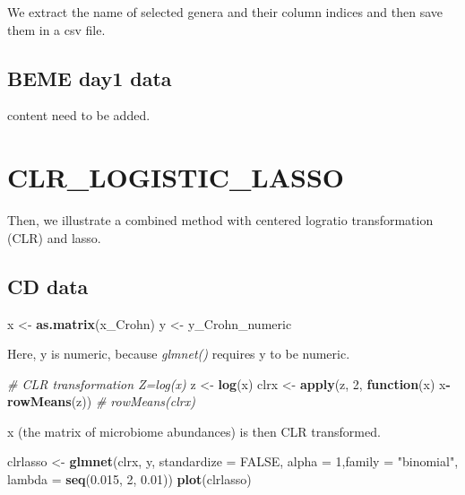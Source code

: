 \documentclass[]{book}
\newenvironment{Shaded}{\begin{snugshade}}{\end{snugshade}}
\newcommand{\KeywordTok}[1]{\textcolor[rgb]{0.13,0.29,0.53}{\textbf{#1}}}
\newcommand{\DataTypeTok}[1]{\textcolor[rgb]{0.13,0.29,0.53}{#1}}
\newcommand{\DecValTok}[1]{\textcolor[rgb]{0.00,0.00,0.81}{#1}}
\newcommand{\FloatTok}[1]{\textcolor[rgb]{0.00,0.00,0.81}{#1}}
\newcommand{\StringTok}[1]{\textcolor[rgb]{0.31,0.60,0.02}{#1}}
\newcommand{\CommentTok}[1]{\textcolor[rgb]{0.56,0.35,0.01}{\textit{#1}}}
\newcommand{\OtherTok}[1]{\textcolor[rgb]{0.56,0.35,0.01}{#1}}
\newcommand{\ControlFlowTok}[1]{\textcolor[rgb]{0.13,0.29,0.53}{\textbf{#1}}}
\newcommand{\OperatorTok}[1]{\textcolor[rgb]{0.81,0.36,0.00}{\textbf{#1}}}
\newcommand{\NormalTok}[1]{#1}
\begin{document}
We extract the name of selected genera and their column indices and then
save them in a csv file.

\section{BEME day1 data}\label{beme-day1-data-1}

content need to be added.

\chapter{CLR\_LOGISTIC\_LASSO}\label{clr}

Then, we illustrate a combined method with centered logratio
transformation (CLR) and lasso.

\section{CD data}\label{cd-data-1}

\begin{Shaded}
\begin{Highlighting}[]
\NormalTok{x <-}\StringTok{ }\KeywordTok{as.matrix}\NormalTok{(x_Crohn)}
\NormalTok{y <-}\StringTok{ }\NormalTok{y_Crohn_numeric }
\end{Highlighting}
\end{Shaded}

Here, y is numeric, because \emph{glmnet()} requires y to be numeric.

\begin{Shaded}
\begin{Highlighting}[]
\CommentTok{# CLR transformation Z=log(x)}
\NormalTok{z <-}\StringTok{ }\KeywordTok{log}\NormalTok{(x)}
\NormalTok{clrx <-}\StringTok{ }\KeywordTok{apply}\NormalTok{(z, }\DecValTok{2}\NormalTok{, }\ControlFlowTok{function}\NormalTok{(x) x}\OperatorTok{-}\KeywordTok{rowMeans}\NormalTok{(z))}
\CommentTok{# rowMeans(clrx)  }
\end{Highlighting}
\end{Shaded}

x (the matrix of microbiome abundances) is then CLR transformed.

\begin{Shaded}
\begin{Highlighting}[]
\NormalTok{clrlasso <-}\StringTok{ }\KeywordTok{glmnet}\NormalTok{(clrx, y, }\DataTypeTok{standardize =} \OtherTok{FALSE}\NormalTok{, }\DataTypeTok{alpha =} \DecValTok{1}\NormalTok{,}\DataTypeTok{family =} \StringTok{"binomial"}\NormalTok{, }
                   \DataTypeTok{lambda =} \KeywordTok{seq}\NormalTok{(}\FloatTok{0.015}\NormalTok{, }\DecValTok{2}\NormalTok{, }\FloatTok{0.01}\NormalTok{)) }
\KeywordTok{plot}\NormalTok{(clrlasso)}
\end{Highlighting}
\end{Shaded}
\end{document}
